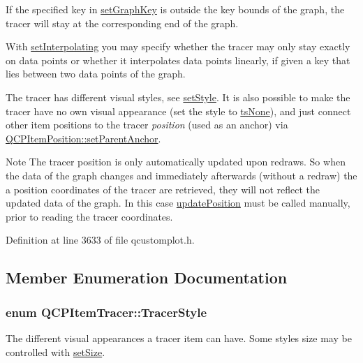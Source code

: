If the specified key in \hyperlink{class_q_c_p_item_tracer_a6840143b42f3b685cedf7c6d83a704c8}{set\+Graph\+Key} is outside the key bounds of the graph, the tracer will stay at the corresponding end of the graph.

With \hyperlink{class_q_c_p_item_tracer_a6c244a9d1175bef12b50afafd4f5fcd2}{set\+Interpolating} you may specify whether the tracer may only stay exactly on data points or whether it interpolates data points linearly, if given a key that lies between two data points of the graph.

The tracer has different visual styles, see \hyperlink{class_q_c_p_item_tracer_a41a2ac4f1acd7897b4e2a2579c03204e}{set\+Style}. It is also possible to make the tracer have no own visual appearance (set the style to \hyperlink{class_q_c_p_item_tracer_a2f05ddb13978036f902ca3ab47076500aac27462c79146225bfa8fba24d2ee8a4}{ts\+None}), and just connect other item positions to the tracer {\itshape position} (used as an anchor) via \hyperlink{class_q_c_p_item_position_ac094d67a95d2dceafa0d50b9db3a7e51}{Q\+C\+P\+Item\+Position\+::set\+Parent\+Anchor}.

\begin{DoxyNote}{Note}
The tracer position is only automatically updated upon redraws. So when the data of the graph changes and immediately afterwards (without a redraw) the a position coordinates of the tracer are retrieved, they will not reflect the updated data of the graph. In this case \hyperlink{class_q_c_p_item_tracer_a5b90296109e36384aedbc8908a670413}{update\+Position} must be called manually, prior to reading the tracer coordinates. 
\end{DoxyNote}


Definition at line 3633 of file qcustomplot.\+h.



\subsection{Member Enumeration Documentation}
\hypertarget{class_q_c_p_item_tracer_a2f05ddb13978036f902ca3ab47076500}{}
\subsubsection[{Tracer\+Style}]{\setlength{\rightskip}{0pt plus 5cm}enum {\bf Q\+C\+P\+Item\+Tracer\+::\+Tracer\+Style}}\label{class_q_c_p_item_tracer_a2f05ddb13978036f902ca3ab47076500}
The different visual appearances a tracer item can have. Some styles size may be controlled with \hyperlink{class_q_c_p_item_tracer_ae47fe0617f5fef5fdb766999569be10a}{set\+Size}.

